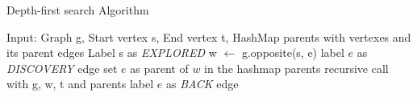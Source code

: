 \begin{algorithm}[h]
\caption{Depth-first search Algorithm}
\label{alg:DFS}
\begin{algorithmic}
\REQUIRE Input: Graph g, Start vertex s, End vertex t, HashMap parents with vertexes and its parent edges
\STATE Label s as \textit{EXPLORED}
\STATE w $\gets$ g.opposite(s, e)
\STATE label $e$ as \textit{DISCOVERY} edge
\STATE set $e$ as parent of $w$ in the hashmap parents
\STATE recursive call with g, w, t and parents
\ELSE
\STATE label $e$ as \textit{BACK} edge
\ENDIF
\ENDIF
\ENDFOR
\end{algorithmic}
\end{algorithm}
